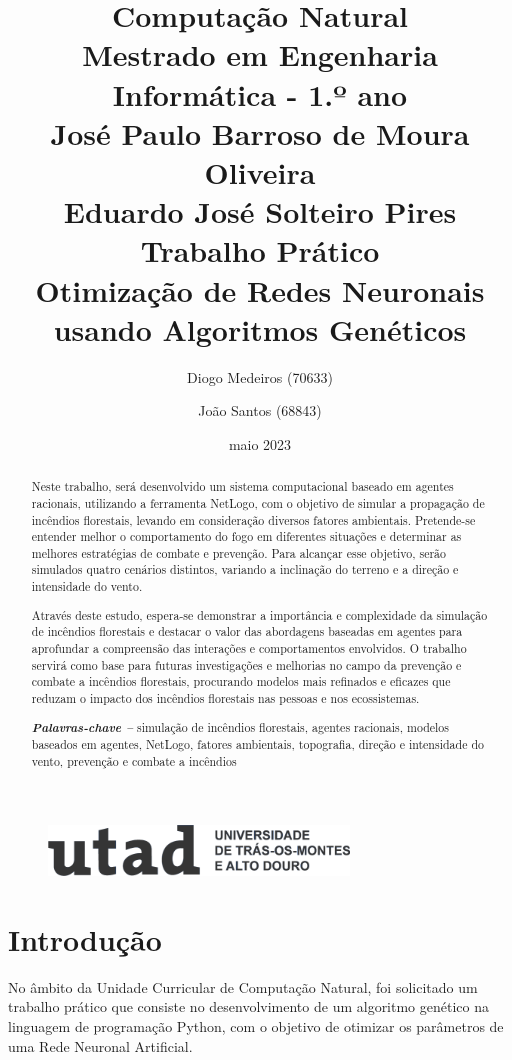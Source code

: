 \documentclass[a4paper, portuguese]{report}
\title{{\textbf{Computação Natural}}\\ Mestrado em Engenharia Informática - 1.º ano\\\vspace*{1cm} José Paulo Barroso de Moura Oliveira\\ Eduardo José Solteiro Pires\\\vspace*{3cm}\textbf{Trabalho Prático}\\\vspace*{0.5cm} Otimização de Redes Neuronais usando Algoritmos Genéticos \vspace*{1cm}}
\author{Diogo Medeiros (70633) \and João Santos (68843)}
\date{maio 2023}
\providecommand{\keywords}[1]
{
  \small	
  \textbf{\textit{Palavras-chave --}} #1
}
\begin{document}
\begin{figure}
\includegraphics[width=8cm]{images/utad.png}
\end{figure}

\maketitle

\begin{abstract}

Neste trabalho, será desenvolvido um sistema computacional baseado em agentes racionais, utilizando a ferramenta NetLogo, com o objetivo de simular a propagação de incêndios florestais, levando em consideração diversos fatores ambientais. Pretende-se entender melhor o comportamento do fogo em diferentes situações e determinar as melhores estratégias de combate e prevenção. Para alcançar esse objetivo, serão simulados quatro cenários distintos, variando a inclinação do terreno e a direção e intensidade do vento.

Através deste estudo, espera-se demonstrar a importância e complexidade da simulação de incêndios florestais e destacar o valor das abordagens baseadas em agentes para aprofundar a compreensão das interações e comportamentos envolvidos. O trabalho servirá como base para futuras investigações e melhorias no campo da prevenção e combate a incêndios florestais, procurando modelos mais refinados e eficazes que reduzam o impacto dos incêndios florestais nas pessoas e nos ecossistemas.

\keywords{simulação de incêndios florestais, agentes racionais, modelos baseados em agentes, NetLogo, fatores ambientais, topografia, direção e intensidade do vento, prevenção e combate a incêndios}

\end{abstract}

\tableofcontents
\listoffigures
\listoftables
\listofalgorithms

\chapter{Introdução}\label{chapter:introduction}
No âmbito da Unidade Curricular de Computação Natural, foi solicitado um trabalho prático que consiste no desenvolvimento de um algoritmo genético na linguagem de programação Python, com o objetivo de otimizar os parâmetros de uma Rede Neuronal Artificial.
\end{document}

